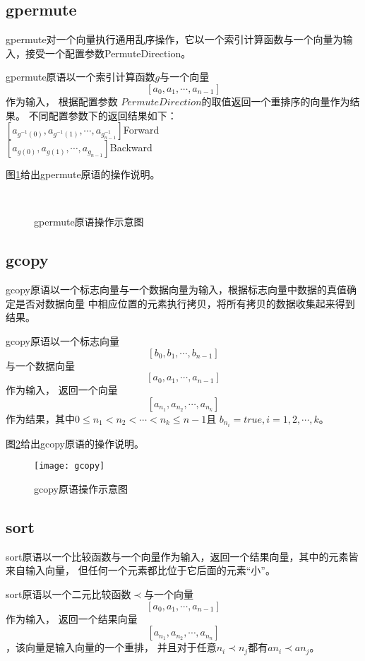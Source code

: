\subsection{gpermute}
gpermute对一个向量执行通用乱序操作，它以一个索引计算函数与一个向量为输入，接受一个配置参数PermuteDirection。
\begin{definition}
  gpermute原语以一个索引计算函数$g$与一个向量$$[a_0, a_1, \cdots, a_{n-1}]$$作为输入，
  根据配置参数  $PermuteDirection$的取值返回一个重排序的向量作为结果。
  不同配置参数下的返回结果如下：\\
  $[a_{g^{-1}(0)}, a_{g^{-1}(1)}, \cdots, a_{g^{-1}_{n-1}}]$\hfill{}Forward\\
  $[a_{g(0)}, a_{g(1)}, \cdots, a_{g_{n-1}}]$\hfill{}Backward\\  
\end{definition}

图\ref{fig:gpermute-diagram}给出gpermute原语的操作说明。
\begin{figure}[h]
  \centering
  \\
  \caption{gpermute原语操作示意图}
  \label{fig:gpermute-diagram}
\end{figure}

\subsection{gcopy}
gcopy原语以一个标志向量与一个数据向量为输入，根据标志向量中数据的真值确定是否对数据向量
中相应位置的元素执行拷贝，将所有拷贝的数据收集起来得到结果。
\begin{definition}
  gcopy原语以一个标志向量$$[b_0, b_1, \cdots, b_{n-1}]$$与一个数据向量$$[a_0, a_1, \cdots, a_{n-1}]$$作为输入，
  返回一个向量$$[a_{n_1}, a_{n_2}, \cdots, a_{n_k}]$$作为结果，其中$0\le{}n_1<n_2<\cdots{}<n_k\le{}n-1$且
  $b_{n_i}=true, i=1,2,\cdots,k$。
\end{definition}

图\ref{fig:gcopy-diagram}给出gcopy原语的操作说明。
\begin{figure}[h]
  \centering
  \texttt{[image: gcopy]}
  \caption{gcopy原语操作示意图}
  \label{fig:gcopy-diagram}
\end{figure}

\subsection{sort}
sort原语以一个比较函数与一个向量作为输入，返回一个结果向量，其中的元素皆来自输入向量，
但任何一个元素都比位于它后面的元素“小”。
\begin{definition}
  sort原语以一个二元比较函数$\prec$与一个向量$$[a_0, a_1, \cdots, a_{n-1}]$$作为输入，
  返回一个结果向量$$[a_{n_1}, a_{n_2}, \cdots, a_{n_n}]$$，该向量是输入向量的一个重排，
  并且对于任意$n_i\prec{}n_j$都有$a{n_i}\prec{}a{n_j}$。
\end{definition}

